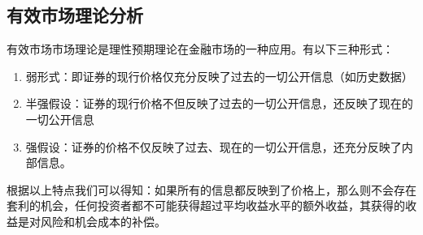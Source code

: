 \documentclass{xjtureport}
\begin{document}
\subsection{有效市场理论分析}
有效市场市场理论是理性预期理论在金融市场的一种应用。有以下三种形式：
    \begin{enumerate}
        \item 弱形式：即证券的现行价格仅充分反映了过去的一切公开信息（如历史数据）
        \item 半强假设：证券的现行价格不但反映了过去的一切公开信息，还反映了现在的一切公开信息
        \item 强假设：证券的价格不仅反映了过去、现在的一切公开信息，还充分反映了内部信息。
    \end{enumerate}
\par 根据以上特点我们可以得知：如果所有的信息都反映到了价格上，那么则不会存在套利的机会，任何投资者都不可能获得超过平均收益水平的额外收益，其获得的收益是对风险和机会成本的补偿。
\end{document}
